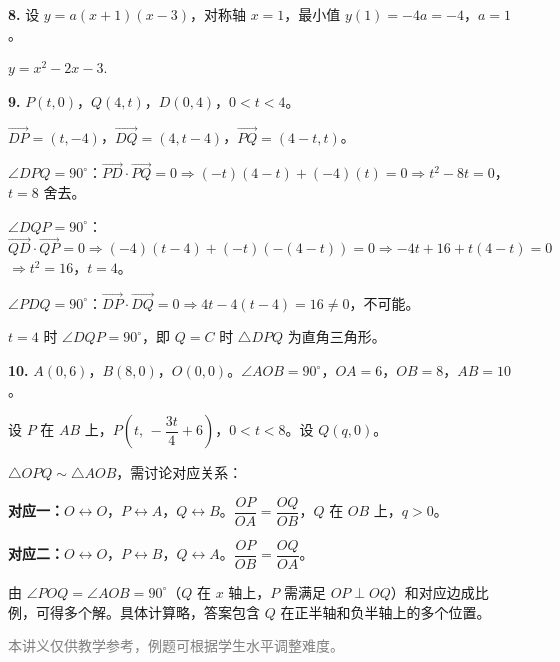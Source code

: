 \documentclass[12pt, a4paper]{ctexart}
\begin{document}
\begin{knowledgebox}[综合练习参考答案]
\textbf{8.} 设 $y=a(x+1)(x-3)$，对称轴 $x=1$，最小值 $y(1)=-4a=-4$，$a=1$。

$\boxed{y=x^2-2x-3.}$

\medskip

\textbf{9.} $P(t,0)$，$Q(4,t)$，$D(0,4)$，$0<t<4$。

$\vec{DP}=(t,-4)$，$\vec{DQ}=(4,t-4)$，$\vec{PQ}=(4-t,t)$。

$\angle DPQ=90^\circ$：$\vec{PD}\cdot\vec{PQ}=0\Rightarrow(-t)(4-t)+(-4)(t)=0\Rightarrow t^2-8t=0$，$t=8$ 舍去。

$\angle DQP=90^\circ$：$\vec{QD}\cdot\vec{QP}=0\Rightarrow(-4)(t-4)+(-t)(-(4-t))=0\Rightarrow-4t+16+t(4-t)=0$
$\Rightarrow t^2=16$，$t=4$。

$\angle PDQ=90^\circ$：$\vec{DP}\cdot\vec{DQ}=0\Rightarrow 4t-4(t-4)=16\ne 0$，不可能。

$\boxed{t=4}$ 时 $\angle DQP=90^\circ$，即 $Q=C$ 时 $\triangle DPQ$ 为直角三角形。

\medskip

\textbf{10.} $A(0,6)$，$B(8,0)$，$O(0,0)$。$\angle AOB=90^\circ$，$OA=6$，$OB=8$，$AB=10$。

设 $P$ 在 $AB$ 上，$P\!\left(t,\,-\dfrac{3t}{4}+6\right)$，$0<t<8$。设 $Q(q,0)$。

$\triangle OPQ\sim\triangle AOB$，需讨论对应关系：

\textbf{对应一：}$O\leftrightarrow O$，$P\leftrightarrow A$，$Q\leftrightarrow B$。$\dfrac{OP}{OA}=\dfrac{OQ}{OB}$，$Q$ 在 $OB$ 上，$q>0$。

\textbf{对应二：}$O\leftrightarrow O$，$P\leftrightarrow B$，$Q\leftrightarrow A$。$\dfrac{OP}{OB}=\dfrac{OQ}{OA}$。

由 $\angle POQ=\angle AOB=90^\circ$（$Q$ 在 $x$ 轴上，$P$ 需满足 $OP\perp OQ$）和对应边成比例，可得多个解。具体计算略，答案包含 $Q$ 在正半轴和负半轴上的多个位置。

\end{knowledgebox}

\vfill
\begin{center}
\small\textcolor{gray}{本讲义仅供教学参考，例题可根据学生水平调整难度。}
\end{center}
\end{document}
